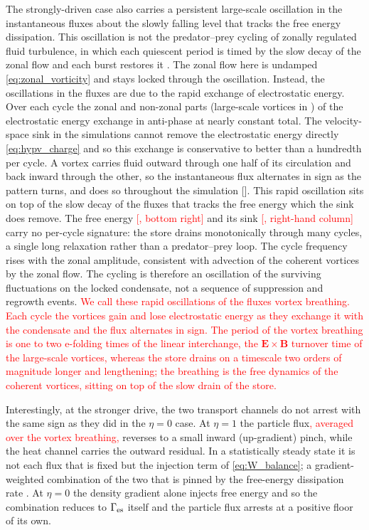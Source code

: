 \documentclass{jpp}
\renewcommand{\vec}[1]{\boldsymbol{#1}}
\newcommand{\vec}[1]{\boldsymbol{#1}}
\newcommand{\vE}{\vec{E}}
\newcommand{\vB}{\vec{B}}
\begin{document}
The strongly-driven case also carries a persistent large-scale oscillation in the instantaneous fluxes about the slowly falling level that tracks the free energy dissipation. This oscillation is not the predator--prey cycling of zonally regulated fluid turbulence, in which each quiescent period is timed by the slow decay of the zonal flow and each burst restores it \citep{ClarkeUnpub}. The zonal flow here is undamped \cref{eq:zonal_vorticity} and stays locked through the oscillation. Instead, the oscillations in the fluxes are due to the rapid exchange of electrostatic energy. Over each cycle the zonal and non-zonal parts (large-scale vortices in ) of the electrostatic energy exchange in anti-phase at nearly constant total. The velocity-space sink in the simulations cannot remove the electrostatic energy directly \cref{eq:hypv_charge} and so this exchange is conservative to better than a hundredth per cycle. A vortex carries fluid outward through one half of its circulation and back inward through the other, so the instantaneous flux alternates in sign as the pattern turns, and does so throughout the simulation []. This rapid oscillation sits on top of the slow decay of the fluxes that tracks the free energy which the sink does remove. The free energy \textcolor{red}{[, bottom right]} and its sink \textcolor{red}{[, right-hand column]} carry no per-cycle signature: the store drains monotonically through many cycles, a single long relaxation rather than a predator--prey loop. The cycle frequency rises with the zonal amplitude, consistent with advection of the coherent vortices by the zonal flow. The cycling is therefore an oscillation of the surviving fluctuations on the locked condensate, not a sequence of suppression and regrowth events. \textcolor{red}{We call these rapid oscillations of the fluxes vortex breathing. Each cycle the vortices gain and lose electrostatic energy as they exchange it with the condensate and the flux alternates in sign. The period of the vortex breathing is one to two e-folding times of the linear interchange, the $\vE \times \vB$ turnover time of the large-scale vortices, whereas the store drains on a timescale two orders of magnitude longer and lengthening; the breathing is the free dynamics of the coherent vortices, sitting on top of the slow drain of the store.}

Interestingly, at the stronger drive, the two transport channels do not arrest with the same sign as they did in the $\eta=0$ case. At $\eta = 1$ the particle flux\textcolor{red}{, averaged over the vortex breathing,} reverses to a small inward (up-gradient) pinch, while the heat channel carries the outward residual. In a statistically steady state it is not each flux that is fixed but the injection term of \cref{eq:W_balance}; a gradient-weighted combination of the two that is pinned by the free-energy dissipation rate \citep{KrommesHu1994, Sugama1996}. At $\eta = 0$ the density gradient alone injects free energy and so the combination reduces to $\Gamma_{\rm es}$ itself and the particle flux arrests at a positive floor of its own.
\end{document}
